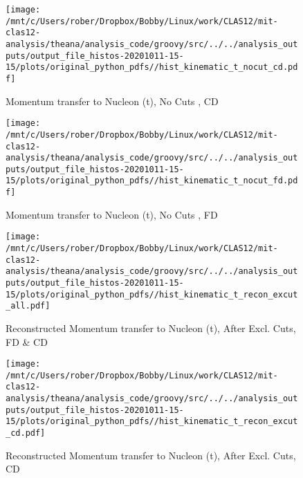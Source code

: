 \documentclass{article}
\begin{document}
\begin{landscape}
    \begin{figure}[h]
        \centering

        \texttt{[image: /mnt/c/Users/rober/Dropbox/Bobby/Linux/work/CLAS12/mit-clas12-analysis/theana/analysis\_code/groovy/src/../../analysis\_outputs/output\_file\_histos-20201011-15-15/plots/original\_python\_pdfs//hist\_kinematic\_t\_nocut\_cd.pdf]}
        \captionsetup{textformat=empty,labelformat=blank}
        \caption{Momentum transfer to Nucleon (t), No Cuts , CD}
    \end{figure}
    \clearpage
    
    \begin{figure}[h]
        \centering

        \texttt{[image: /mnt/c/Users/rober/Dropbox/Bobby/Linux/work/CLAS12/mit-clas12-analysis/theana/analysis\_code/groovy/src/../../analysis\_outputs/output\_file\_histos-20201011-15-15/plots/original\_python\_pdfs//hist\_kinematic\_t\_nocut\_fd.pdf]}
        \captionsetup{textformat=empty,labelformat=blank}
        \caption{Momentum transfer to Nucleon (t), No Cuts , FD}
    \end{figure}
    \clearpage
    
    \begin{figure}[h]
        \centering

        \texttt{[image: /mnt/c/Users/rober/Dropbox/Bobby/Linux/work/CLAS12/mit-clas12-analysis/theana/analysis\_code/groovy/src/../../analysis\_outputs/output\_file\_histos-20201011-15-15/plots/original\_python\_pdfs//hist\_kinematic\_t\_recon\_excut\_all.pdf]}
        \captionsetup{textformat=empty,labelformat=blank}
        \caption{Reconstructed Momentum transfer to Nucleon (t), After Excl. Cuts, FD \& CD}
    \end{figure}
    \clearpage
    
    \begin{figure}[h]
        \centering

        \texttt{[image: /mnt/c/Users/rober/Dropbox/Bobby/Linux/work/CLAS12/mit-clas12-analysis/theana/analysis\_code/groovy/src/../../analysis\_outputs/output\_file\_histos-20201011-15-15/plots/original\_python\_pdfs//hist\_kinematic\_t\_recon\_excut\_cd.pdf]}
        \captionsetup{textformat=empty,labelformat=blank}
        \caption{Reconstructed Momentum transfer to Nucleon (t), After Excl. Cuts, CD}
    \end{figure}
    \clearpage
    
    \begin{figure}[h]
        \centering


\end{figure}
\end{landscape}
\end{document}
